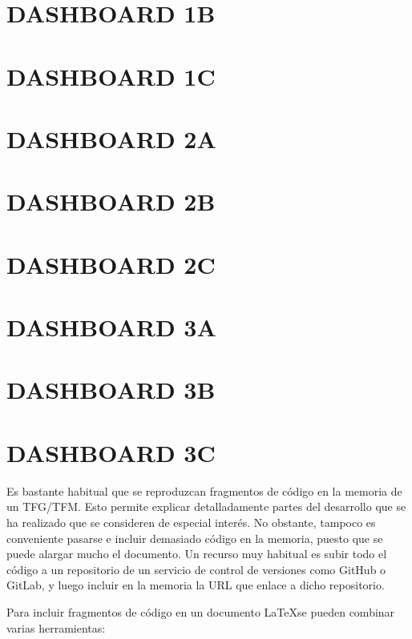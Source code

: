\documentclass[a4paper, 12pt]{book}
\begin{document}
\section{DASHBOARD 1B}
\section{DASHBOARD 1C}
\section{DASHBOARD 2A}
\section{DASHBOARD 2B}
\section{DASHBOARD 2C}
\section{DASHBOARD 3A}
\section{DASHBOARD 3B}
\section{DASHBOARD 3C}

Es bastante habitual que se reproduzcan fragmentos de código en la memoria de un TFG/TFM.
Esto permite explicar detalladamente partes del desarrollo que se ha realizado que se consideren
de especial interés. No obstante, tampoco es conveniente pasarse e incluir demasiado código en
la memoria, puesto que se puede alargar mucho el documento. Un recurso muy habitual es subir
todo el código a un repositorio de un servicio de control de versiones como GitHub o GitLab,
y luego incluir en la memoria la URL que enlace a dicho repositorio.

Para incluir fragmentos de código en un documento \LaTeX se pueden combinar varias
herramientas:
\end{document}
